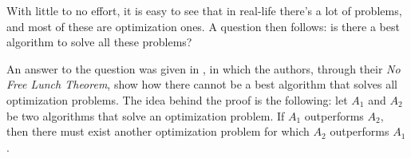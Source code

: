 \documentclass{subfiles}
\begin{document}
    With little to no effort, it is easy to see that in real-life there's a lot of problems,
        and most of these are optimization ones.
        A question then follows: is there a best algorithm to solve all these problems?

    An answer to the question was given in \cite{WolpertM1997},
        in which the authors, through their \emph{No Free Lunch Theorem},
        show how there cannot be a best algorithm that solves all optimization problems.
        The idea behind the proof is the following: let $A_{1}$ and $A_{2}$ be two algorithms
        that solve an optimization problem. If $A_{1}$ outperforms $A_{2}$,
        then there must exist another optimization problem for which $A_{2}$ outperforms $A_{1}$.
\end{document}
